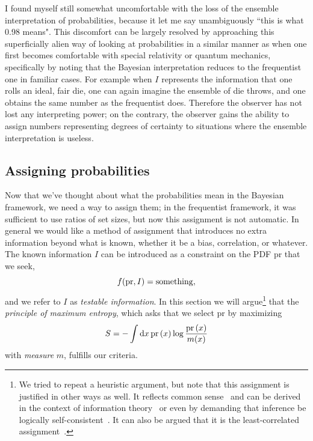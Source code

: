 I found myself still somewhat uncomfortable with the loss of the ensemble
interpretation of probabilities, because it let me say unambiguously ``this is
what 0.98 means". This discomfort can be largely resolved by approaching this
superficially alien way of looking at probabilities in a similar manner as when
one first becomes comfortable with special relativity or quantum mechanics,
specifically by noting that the Bayesian interpretation reduces to the
frequentist one in familiar cases. For example when $I$ represents the
information that one rolls an ideal, fair die, one can again imagine the
ensemble of die throws, and one obtains the same number as the frequentist does.
Therefore the observer has not lost any interpreting power; on the contrary, the 
observer gains the ability to assign numbers representing degrees of certainty to
situations where the ensemble interpretation is useless.


\subsection{Assigning probabilities}


Now that we've thought about what the probabilities mean in the Bayesian
framework, we need a way to assign them; in the frequentist framework, it was
sufficient to use ratios of set sizes, but now this assignment is not automatic.
In general we would like a method of assignment that introduces no extra
information beyond what is known, whether it be a bias, correlation, or
whatever. The known information $I$ can be introduced as a constraint
on the PDF pr that we seek,
\begin{equation}
f({\rm pr},I)={\rm something},
\end{equation}
and we refer to $I$ as {\it testable information}.
In this section we will argue\footnote{We tried to repeat a heuristic argument,
but note that this assignment is justified in other ways as well.
It reflects common sense~\cite{jaynes_foundations_1963} and
can be derived in the context of information 
theory~\cite{shannon_mathematical_1948} or even by demanding
that inference be logically 
self-consistent~\cite{shore_axiomatic_1980}. It can also be argued
that it is the least-correlated assignment~\cite{Skilling1988}.} 
that the {\it principle of maximum 
entropy}, which asks that we select
pr by maximizing
\begin{equation}\label{eq:ShannonEntropy}
S=-\int \dd{x} \operatorname{pr}\left(x\right) \log \frac{\operatorname{pr}\left(x\right)}{m(x)}
\end{equation}
with {\it measure} $m$, fulfills our criteria.


